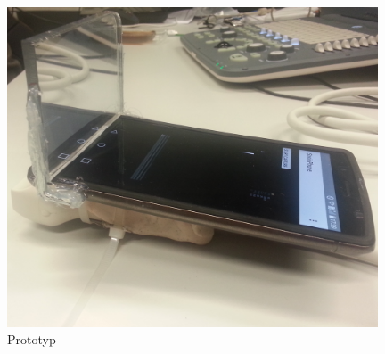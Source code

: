 \begin{figure}[h]
	\centering
	\includegraphics[width=0.98\textwidth]{Prototypen_Bau/Prototyp_fertig2}
	\caption{Prototyp}
	\label{fig:protoyp2}
\end{figure}



